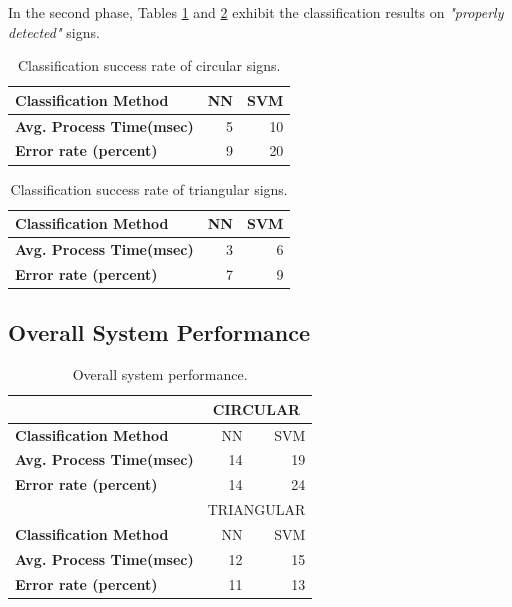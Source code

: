 \documentclass[review,number]{elsarticle}
\begin{document}
In the second phase, Tables \ref{signclassify-table-1} and \ref{signclassify-table-2} exhibit the classification results on \textit{"properly detected"} signs. 

\begin{table}[ht]
	\centering
	\caption{Classification success rate of circular signs.}
	\label{signclassify-table-1}
\begin{tabular}{l r r}
\hline
\textbf{Classification Method} & NN & SVM \\
\hline
\rowcolor[rgb]{0.95,0.95,0.95}\textbf{Avg. Process Time(msec)}			& 5 & 10 \\
\rowcolor[rgb]{0.95,0.95,0.95}\textbf{Error rate (percent)}				& 9 &  20 \\
\hline
\end{tabular}
\end{table}
\begin{table}[ht]
	\centering
	\caption{Classification success rate of triangular signs.}
	\label{signclassify-table-2}
\begin{tabular}{l r r}
\hline
\textbf{Classification Method} & NN  & SVM  \\
\hline
\rowcolor[rgb]{0.95,0.95,0.95}\textbf{Avg. Process Time(msec)}			& 3 & 6 \\
\rowcolor[rgb]{0.95,0.95,0.95}\textbf{Error rate (percent)}				&  7 &  9 \\
\hline
\end{tabular}
\end{table}


\subsection{Overall System Performance}
\begin{table}[ht]
	\centering
	\caption{Overall system performance.}
	\label{signdetection-overall}
\begin{tabular}{|l|r r|}
\hline
& \multicolumn{2}{c|}{CIRCULAR} \\
\hline
\textbf{Classification Method} & NN & SVM \\
\hline
\textbf{Avg. Process Time(msec)}			& 14 & 19 \\
\hline
\textbf{Error rate (percent)}				&  14 &  24 \\
\hline

\hline
& \multicolumn{2}{c|}{TRIANGULAR} \\
\hline
\textbf{Classification Method} & NN & SVM \\
\hline
\textbf{Avg. Process Time(msec)}			& 12 & 15 \\
\hline
\textbf{Error rate (percent)}				&  11 &  13 \\
\hline
\end{tabular}
\end{table}
\end{document}
